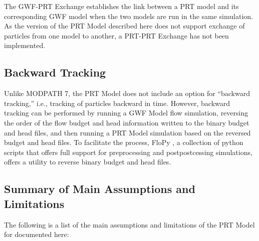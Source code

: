 The GWF-PRT Exchange establishes the link between a PRT model and its corresponding GWF model when the two models are run in the same simulation. As the version of the PRT Model described here does not support exchange of particles from one model to another, a PRT-PRT Exchange has not been implemented.

\subsection{Backward Tracking} \label{sec:backwardtracking}

Unlike MODPATH 7, the PRT Model does not include an option for ``backward tracking,'' i.e., tracking of particles backward in time. However, backward tracking can be performed by running a GWF Model flow simulation, reversing the order of the flow budget and head information written to the binary budget and head files, and then running a PRT Model simulation based on the reversed budget and head files. To facilitate the process, FloPy \citep{bakker2016flopy, hughes2023flopy, flopysoftware}, a collection of python scripts that offers full support for preprocessing and postpostcessing \mf simulations, offers a utility to reverse binary budget and head files.

\subsection{Summary of Main Assumptions and Limitations}

The following is a list of the main assumptions and limitations of the PRT Model for \mf documented here:

